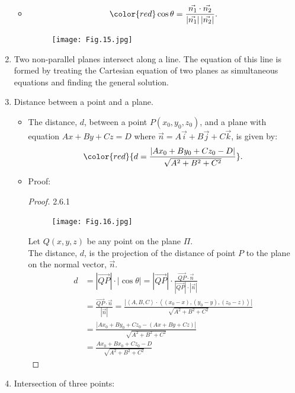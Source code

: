 \documentclass[12pt, a4paper]{article}
\begin{document}
\begin{enumerate}
\begin{itemize}
    \item $$\color{red} \cos\theta=\frac{\vec{n_1}\cdot\vec{n_2}}{\left|\vec{n_1}\right|\left|\vec{n_2}\right|}.$$
    \begin{figure}[H]
      \centering
      \texttt{[image: Fig.15.jpg]}
    \end{figure}
  \end{itemize}
  \item Two non-parallel planes intersect along a line. The equation of this line is formed by treating the Cartesian equation of two planes as simultaneous equations and finding the general solution.
  \item Distance between a point and a plane. 
  \begin{itemize}
    \item The distance, $d$, between a point $P(x_0,y_0,z_0)$, and a plane with equation $Ax+By+Cz=D$ where $\vec{n}=A\vec{i}+B\vec{j}+C\vec{k}$, is given by: 
    $${\color{red}{d=\frac{\left|Ax_0+By_0+Cz_0-D\right|}{\sqrt{A^2+B^2+C^2}}}}.$$ 
    \item Proof: 
    \begin{proof}{2.6.1}{}
      \begin{figure}[H]
        \centering
        \texttt{[image: Fig.16.jpg]}
      \end{figure}
      Let $Q(x,y,z)$ be any point on the plane $\Pi$.\\
      The distance, $d$, is the projection of the distance of point $P$ to the plane on the normal vector, $\vec{n}$.
      $$\begin{aligned}
        d&=\left|\overrightarrow{QP}\right|\cdot\left|\cos\theta\right|=\left|\overrightarrow{QP}\right|\cdot\frac{\overrightarrow{QP}\cdot\vec{n}}{\left|\overrightarrow{QP}\right|\cdot\left|\vec{n}\right|}\\
        &=\frac{\overrightarrow{QP}\cdot\vec{n}}{\left|\vec{n}\right|}=\frac{\left|\left\langle A,B,C\right\rangle\cdot\left\langle (x_0-x), (y_0-y), (z_0-z)\right\rangle\right|}{\sqrt{A^2+B^2+C^2}}\\
        &=\frac{\left|Ax_0+By_0+Cz_0-(Ax+By+Cz)\right|}{\sqrt{A^2+B^2+C^2}}\\
        &=\frac{Ax_0+Bx_0+Cz_0-D}{\sqrt{A^2+B^2+C^2}}
      \end{aligned}$$
    \end{proof}
  \end{itemize}
  \item Intersection of three points: 
  \begin{itemize}

\end{itemize}
\end{enumerate}
\end{document}
